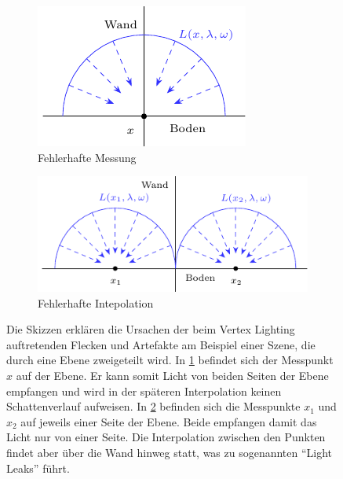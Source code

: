 		\begin{figure}[h]
			\begin{subfigure}[t]{0.4\textwidth}
				\center
				\includegraphics{gg_fig/vertex_lighting-error_1.pdf}
				\caption{Fehlerhafte Messung}
				\label{subfig:vertex-lighting-error-measurement}
			\end{subfigure}
			\begin{subfigure}[t]{0.6\textwidth}
				\center
				\includegraphics{gg_fig/vertex_lighting-error_2.pdf}
				\caption{Fehlerhafte Intepolation}
				\label{subfig:vertex-lighting-error-interpolation}
			\end{subfigure}
			\caption[Fehlerursachen des Vertex Lighting]{Die Skizzen erklären die Ursachen der beim Vertex Lighting auftretenden Flecken und Artefakte am Beispiel einer Szene, die durch eine Ebene zweigeteilt wird. In \ref{subfig:vertex-lighting-error-measurement} befindet sich der Messpunkt $x$ auf der Ebene. Er kann somit Licht von beiden Seiten der Ebene empfangen und wird in der späteren Interpolation keinen Schattenverlauf aufweisen. In \ref{subfig:vertex-lighting-error-interpolation} befinden sich die Messpunkte $x_1$ und $x_2$ auf jeweils einer Seite der Ebene. Beide empfangen damit das Licht nur von einer Seite. Die Interpolation zwischen den Punkten findet aber über die Wand hinweg statt, was zu sogenannten \enquote{Light Leaks} führt.}
			\label{fig:vertex-lighting-error}
		\end{figure}

